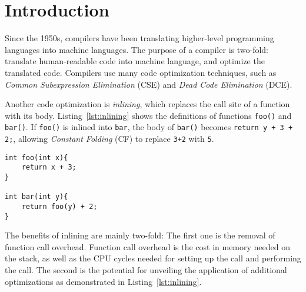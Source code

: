 
\section{Introduction}
\label{introduction}

Since the 1950s, compilers have been translating higher-level programming
languages into machine languages. The purpose of a compiler is two-fold:
translate human-readable code into machine language, and optimize the translated
code. Compilers use many code optimization techniques, such as \textit{Common
Subexpression Elimination} (CSE) and \textit{Dead Code Elimination} (DCE).



Another code optimization is \textit{inlining}, which replaces the call site of
a function with its body. Listing~\ref{lst:inlining} shows the definitions of
functions \lstinline!foo()! and \lstinline!bar()!. If \lstinline!foo()! is
inlined into \lstinline!bar!, the body of \lstinline!bar()! becomes
\lstinline!return y + 3 + 2;!, allowing \textit{Constant Folding} (CF) to
replace \lstinline!3+2! with \lstinline!5!.

\begin{centering}
	\noindent\begin{minipage}{\textwidth}
		\begin{CenteredBox}
		\begin{lstlisting}[style=global_customcpp]
int foo(int x){
	return x + 3;
}

int bar(int y){
	return foo(y) + 2;
}
		\end{lstlisting}
		\end{CenteredBox}
	\end{minipage}
	\label{lst:inlining}
\end{centering}

The benefits of inlining are mainly two-fold: The first one is the removal of
function call overhead. Function call overhead is the cost in memory needed on
the stack, as well as the CPU cycles needed for setting up the call and
performing the call. The second is the potential for unveiling the application
of additional optimizations as demonstrated in Listing~\ref{lst:inlining}.

